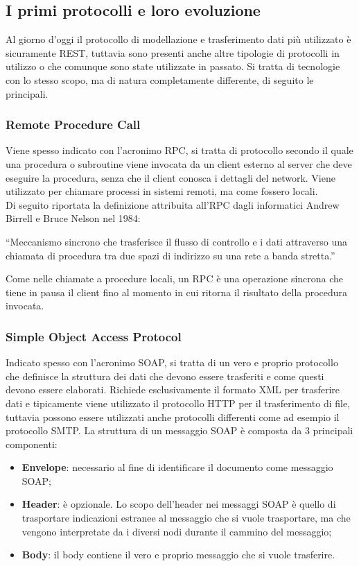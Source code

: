 \subsection*{I primi protocolli e loro evoluzione}
Al giorno d'oggi il protocollo di modellazione e trasferimento dati più utilizzato è sicuramente REST, tuttavia sono presenti anche altre tipologie di protocolli in utilizzo o che comunque sono state utilizzate in passato. Si tratta di tecnologie con lo stesso scopo, ma di natura completamente differente, di seguito le principali.
\subsubsection*{Remote Procedure Call}
Viene spesso indicato con l'acronimo RPC, si tratta di protocollo secondo il quale una procedura o subroutine viene invocata da un client esterno al server che deve eseguire la procedura, senza che il client conosca i dettagli del network. Viene utilizzato per chiamare processi in sistemi remoti, ma come fossero locali. \\
Di seguito riportata la definizione attribuita all'RPC dagli informatici Andrew Birrell e Bruce Nelson nel 1984:
  \begin{quoting}
    “Meccanismo sincrono che trasferisce il flusso di controllo e i dati attraverso una chiamata di procedura tra due spazi di indirizzo su una rete a banda stretta.”
  \end{quoting}
Come nelle chiamate a procedure locali, un RPC è una operazione sincrona che tiene in pausa il client fino al momento in cui ritorna il risultato della procedura invocata.
\subsubsection*{Simple Object Access Protocol}
Indicato spesso con l'acronimo SOAP, si tratta di un vero e proprio protocollo che definisce la struttura dei dati che devono essere trasferiti e come questi devono essere elaborati. Richiede esclusivamente il formato XML per trasferire dati e tipicamente viene utilizzato il protocollo HTTP per il trasferimento di file, tuttavia possono essere utilizzati anche protocolli differenti come ad esempio il protocollo SMTP. La struttura di un messaggio SOAP è composta da 3 principali componenti:
\begin{itemize}
  \item \textbf{Envelope}: necessario al fine di identificare il documento come messaggio SOAP;
  \item \textbf{Header}: è opzionale. Lo scopo dell'header nei messaggi SOAP è quello di trasportare indicazioni estranee al messaggio che si vuole trasportare, ma che vengono interpretate da i diversi nodi durante il cammino del messaggio;
  \item \textbf{Body}: il body contiene il vero e proprio messaggio che si vuole trasferire.
\end{itemize}
